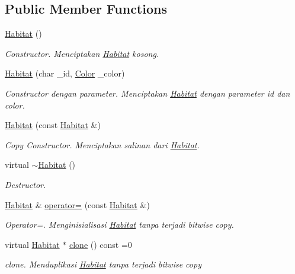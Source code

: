 \subsection*{Public Member Functions}
\begin{DoxyCompactItemize}
\item 
\hyperlink{classHabitat_ae46edb2802c122c0e7c8126e5895bf00}{Habitat} ()
\begin{DoxyCompactList}\small\item\em Constructor. Menciptakan \hyperlink{classHabitat}{Habitat} kosong. \end{DoxyCompactList}\item 
\hyperlink{classHabitat_ae3f26bd17b681c00eabb2cb4c8b2daba}{Habitat} (char \+\_\+id, \hyperlink{color_8h_ab87bacfdad76e61b9412d7124be44c1c}{Color} \+\_\+color)
\begin{DoxyCompactList}\small\item\em Constructor dengan parameter. Menciptakan \hyperlink{classHabitat}{Habitat} dengan parameter id dan color. \end{DoxyCompactList}\item 
\hyperlink{classHabitat_afde9178e3f2467ca26d0a8ff5af30a18}{Habitat} (const \hyperlink{classHabitat}{Habitat} \&)
\begin{DoxyCompactList}\small\item\em Copy Constructor. Menciptakan salinan dari \hyperlink{classHabitat}{Habitat}. \end{DoxyCompactList}\item 
virtual \hyperlink{classHabitat_afd413e46df54891b04262872f04b314f}{$\sim$\+Habitat} ()
\begin{DoxyCompactList}\small\item\em Destructor. \end{DoxyCompactList}\item 
\hyperlink{classHabitat}{Habitat} \& \hyperlink{classHabitat_a5469dca43cea4ace30c056b40f3371ef}{operator=} (const \hyperlink{classHabitat}{Habitat} \&)
\begin{DoxyCompactList}\small\item\em Operator=. Menginisialisasi \hyperlink{classHabitat}{Habitat} tanpa terjadi bitwise copy. \end{DoxyCompactList}\item 
virtual \hyperlink{classHabitat}{Habitat} $\ast$ \hyperlink{classHabitat_a640c071c99dbd3dc9cbf4971dbcaa463}{clone} () const =0
\begin{DoxyCompactList}\small\item\em clone. Menduplikasi \hyperlink{classHabitat}{Habitat} tanpa terjadi bitwise copy \end{DoxyCompactList}\end{DoxyCompactItemize}

